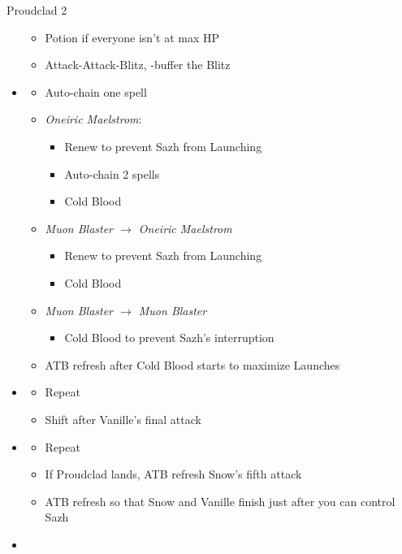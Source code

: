 \begin{paracol}{2}
\begin{battle}{Proudclad 2}
\begin{itemize}
\begin{itemize}
        \item Potion if everyone isn't at max HP
        \item Attack-Attack-Blitz, \rav-buffer the Blitz
    \end{itemize}
    \item \third
    \begin{itemize}
        \item Auto-chain one spell
        \item \textit{Oneiric Maelstrom}:
        \begin{itemize}
            \item Renew to prevent Sazh from Launching
            \item Auto-chain 2 spells
            \item Cold Blood
        \end{itemize}
        \item \textit{Muon Blaster $\rightarrow$ Oneiric Maelstrom}
        \begin{itemize}
            \item Renew to prevent Sazh from Launching
            \item Cold Blood
        \end{itemize}
        \item \textit{Muon Blaster $\rightarrow$ Muon Blaster}
        \begin{itemize}
            \item Cold Blood to prevent Sazh's interruption
        \end{itemize}
        \item ATB refresh after Cold Blood starts to maximize Launches
    \end{itemize}
    \item \fifth
    \begin{itemize}
        \item Repeat
        \item Shift after Vanille's final attack
    \end{itemize}
    \item \first
    \begin{itemize}
        \item Repeat
        \item If Proudclad lands, ATB refresh Snow's fifth attack
        \item ATB refresh so that Snow and Vanille finish just after you can control Sazh
    \end{itemize}
    \item \second

\end{itemize}
\end{battle}
\end{paracol}
